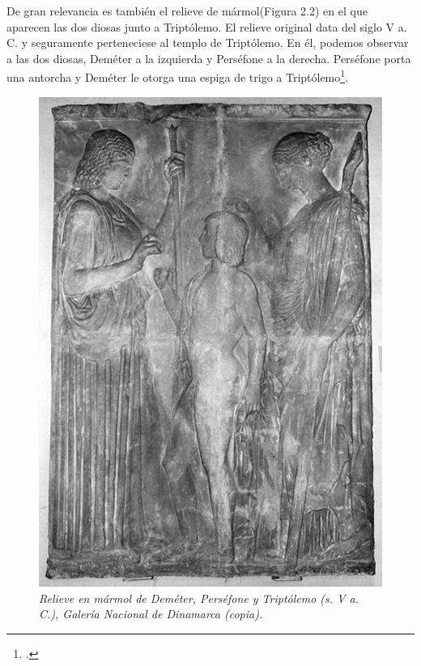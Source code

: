 De gran relevancia es también el relieve de mármol(Figura 2.2) en el que aparecen las dos diosas junto a Triptólemo. El relieve original data del siglo V a. C. y seguramente perteneciese al templo de Triptólemo. En él, podemos observar a las dos diosas, Deméter a la izquierda y Perséfone a la derecha. Perséfone porta una antorcha y Deméter le otorga una espiga de trigo a Triptólemo\footcite[139]{kerenyiEleusisImagenArquetipica2004}. 

\begin{figure}[h!]
	\centering
	\includegraphics[width=0.45\linewidth]{Imagenes/RelieveDosDiosasTriptolemo}
	\caption{\textit{Relieve en mármol de Deméter, Perséfone y Triptólemo (s. V a. C.), Galería Nacional de Dinamarca (copia).}}
	\label{fig:relieve de las dos diosas y triptólemo}
\end{figure}


